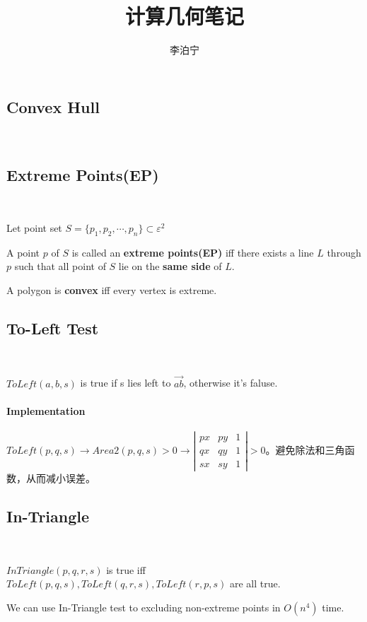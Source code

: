 \documentclass[12pt]{article}
\begin{document}
\begin{CJK*}{GBK}{song}
    \title{计算几何笔记}
    \author{李泊宁}
    \maketitle
    \section{Convex Hull}\
        \subsection{Extreme Points(EP)}\
            \par Let point set $S=\{p_1,p_2,\cdots ,p_n\}\subset \varepsilon^2$
            \par A point $p$ of $S$ is called an \textbf{extreme points(EP)} iff there exists a line $L$ through $p$ such that all point of $S$ lie on the \textbf{same side} of $L$.
            \par A polygon is \textbf{convex} iff every vertex is extreme.
        \subsection{To-Left Test}\
            \par $ToLeft(a,b,s)$ is true if s lies left to $\overrightarrow{ab}$, otherwise it's faluse.
            \paragraph{Implementation}$ToLeft(p,q,s)\to Area2(p,q,s)>0\to \left |\begin{array}{ccc}
                                                                            px & py & 1 \\
                                                                            qx & qy & 1 \\
                                                                            sx & sy & 1 
                                                                          \end{array}\right | >0
            $。避免除法和三角函数，从而减小误差。
        \subsection{In-Triangle}\
            \par $InTriangle(p,q,r,s)$ is true iff $ToLeft(p,q,s),ToLeft(q,r,s),ToLeft(r,p,s)$ are all true.
            \par We can use In-Triangle test to excluding non-extreme points in $O(n^4)$ time.

\end{CJK*}
\end{document}
